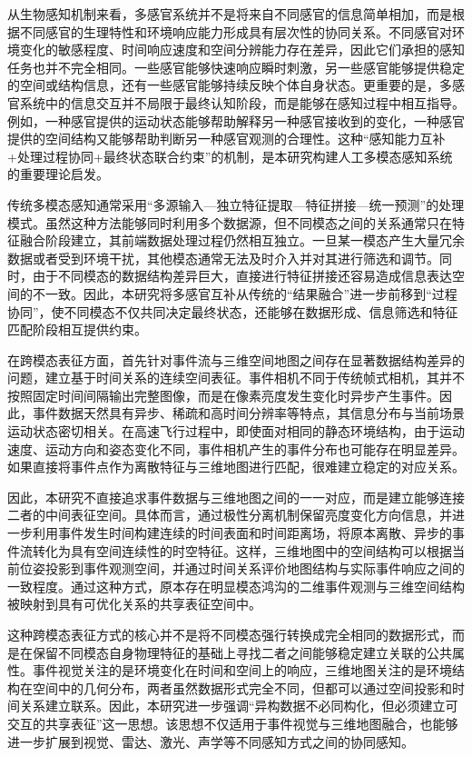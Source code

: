 从生物感知机制来看，多感官系统并不是将来自不同感官的信息简单相加，而是根据不同感官的生理特性和环境响应能力形成具有层次性的协同关系。不同感官对环境变化的敏感程度、时间响应速度和空间分辨能力存在差异，因此它们承担的感知任务也并不完全相同。一些感官能够快速响应瞬时刺激，另一些感官能够提供稳定的空间或结构信息，还有一些感官能够持续反映个体自身状态。更重要的是，多感官系统中的信息交互并不局限于最终认知阶段，而是能够在感知过程中相互指导。例如，一种感官提供的运动状态能够帮助解释另一种感官接收到的变化，一种感官提供的空间结构又能够帮助判断另一种感官观测的合理性。这种“感知能力互补+处理过程协同+最终状态联合约束”的机制，是本研究构建人工多模态感知系统的重要理论启发。

传统多模态感知通常采用“多源输入—独立特征提取—特征拼接—统一预测”的处理模式。虽然这种方法能够同时利用多个数据源，但不同模态之间的关系通常只在特征融合阶段建立，其前端数据处理过程仍然相互独立。一旦某一模态产生大量冗余数据或者受到环境干扰，其他模态通常无法及时介入并对其进行筛选和调节。同时，由于不同模态的数据结构差异巨大，直接进行特征拼接还容易造成信息表达空间的不一致。因此，本研究将多感官互补从传统的“结果融合”进一步前移到“过程协同”，使不同模态不仅共同决定最终状态，还能够在数据形成、信息筛选和特征匹配阶段相互提供约束。

在跨模态表征方面，首先针对事件流与三维空间地图之间存在显著数据结构差异的问题，建立基于时间关系的连续空间表征。事件相机不同于传统帧式相机，其并不按照固定时间间隔输出完整图像，而是在像素亮度发生变化时异步产生事件。因此，事件数据天然具有异步、稀疏和高时间分辨率等特点，其信息分布与当前场景运动状态密切相关。在高速飞行过程中，即使面对相同的静态环境结构，由于运动速度、运动方向和姿态变化不同，事件相机产生的事件分布也可能存在明显差异。如果直接将事件点作为离散特征与三维地图进行匹配，很难建立稳定的对应关系。

因此，本研究不直接追求事件数据与三维地图之间的一一对应，而是建立能够连接二者的中间表征空间。具体而言，通过极性分离机制保留亮度变化方向信息，并进一步利用事件发生时间构建连续的时间表面和时间距离场，将原本离散、异步的事件流转化为具有空间连续性的时空特征。这样，三维地图中的空间结构可以根据当前位姿投影到事件观测空间，并通过时间关系评价地图结构与实际事件响应之间的一致程度。通过这种方式，原本存在明显模态鸿沟的二维事件观测与三维空间结构被映射到具有可优化关系的共享表征空间中。

这种跨模态表征方式的核心并不是将不同模态强行转换成完全相同的数据形式，而是在保留不同模态自身物理特征的基础上寻找二者之间能够稳定建立关联的公共属性。事件视觉关注的是环境变化在时间和空间上的响应，三维地图关注的是环境结构在空间中的几何分布，两者虽然数据形式完全不同，但都可以通过空间投影和时间关系建立联系。因此，本研究进一步强调“异构数据不必同构化，但必须建立可交互的共享表征”这一思想。该思想不仅适用于事件视觉与三维地图融合，也能够进一步扩展到视觉、雷达、激光、声学等不同感知方式之间的协同感知。

